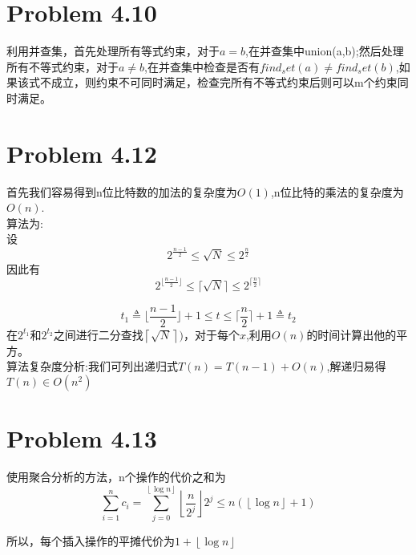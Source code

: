\documentclass[twocolumn]{ctexart}
\begin{document}
\section*{Problem 4.10}
\indent 利用并查集，首先处理所有等式约束，对于$a=b$,在并查集中union(a,b);然后处理所有不等式约束，对于$a\neq b$,在并查集中检查是否有$find_set(a)\neq find_set(b)$,如果该式不成立，则约束不可同时满足，检查完所有不等式约束后则可以m个约束同时满足。

\section*{Problem 4.12}
\indent 首先我们容易得到n位比特数的加法的复杂度为$O(1)$,n位比特的乘法的复杂度为$O(n)$.
\\
算法为:\\
设
\[
2^{\frac{n-1}{2}} \le \sqrt{N} \le 2^{\frac{n}{2}}
\]
因此有
\[2^{\lfloor \frac{n-1}{2} \rfloor} \le \lceil \sqrt{N} \rceil \le 2^{\lceil \frac{n}{2} \rceil}
\]

\[
t_1 \triangleq \lfloor \frac{n-1}{2} \rfloor + 1 \le t \le \lceil \frac{n}{2} \rceil + 1 \triangleq t_2
\]
在$2^{t_1}$和$2^{t_2}$之间进行二分查找$\left\lceil \sqrt{N} \right\rceil)$，对于每个$x$,利用$O(n)$的时间计算出他的平方。\\
算法复杂度分析:我们可列出递归式$T(n)=T(n-1)+O(n)$,解递归易得$T(n) \in O(n^2)$


\section*{Problem 4.13}
\indent 使用聚合分析的方法，n个操作的代价之和为
\[\sum_{i=1}^{n}c_i=\sum_{j=0}^{\left\lfloor\log{n}\right\rfloor}\left\lfloor\frac{n}{2^j}\right\rfloor2^j\le n(\left\lfloor \log{n}\right\rfloor+1)
\]

所以，每个插入操作的平摊代价为$1+\left\lfloor \log{n} \right\rfloor$
\end{document}
